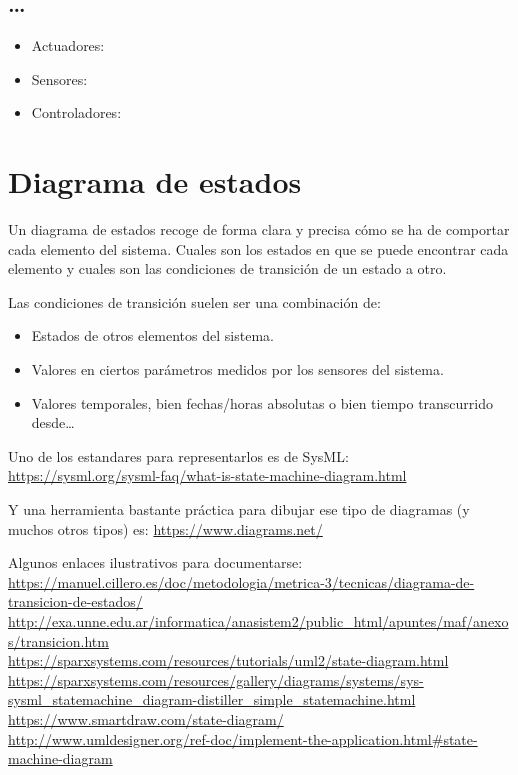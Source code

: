 \documentclass[spanish,10pt,a4paper,final,oneside]{article}
\begin{document}
\subsection{\ldots}
\begin{itemize}
\item Actuadores:
\item Sensores:
\item Controladores: 
\end{itemize}




\section{Diagrama de estados}
Un diagrama de estados recoge de forma clara y precisa cómo se ha de comportar cada elemento del sistema. Cuales son los estados en que se puede encontrar cada elemento y cuales son las condiciones de transición de un estado a otro.

Las condiciones de transición suelen ser una combinación de:
\begin{itemize}
\item Estados de otros elementos del sistema.
\item Valores en ciertos parámetros medidos por los sensores del sistema.
\item Valores temporales, bien fechas/horas absolutas o bien tiempo transcurrido desde\ldots
\end{itemize}

Uno de los estandares para representarlos es de SysML:
\\ \url{https://sysml.org/sysml-faq/what-is-state-machine-diagram.html}

Y una herramienta bastante práctica para dibujar ese tipo de diagramas (y muchos otros tipos) es: \url{https://www.diagrams.net/}

\vspace{0.5cm}
Algunos enlaces ilustrativos para documentarse:
\\ \url{https://manuel.cillero.es/doc/metodologia/metrica-3/tecnicas/diagrama-de-transicion-de-estados/}
\\ \url{http://exa.unne.edu.ar/informatica/anasistem2/public_html/apuntes/maf/anexos/transicion.htm}
\\ \url{https://sparxsystems.com/resources/tutorials/uml2/state-diagram.html}\\ \url{https://sparxsystems.com/resources/gallery/diagrams/systems/sys-sysml_statemachine_diagram-distiller_simple_statemachine.html}
\\ \url{https://www.smartdraw.com/state-diagram/}
\\ \url{http://www.umldesigner.org/ref-doc/implement-the-application.html#state-machine-diagram}
\end{document}
